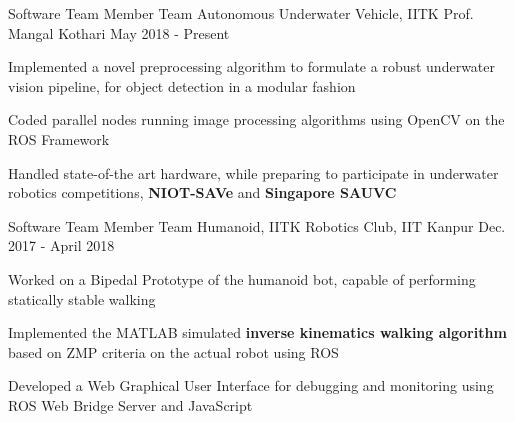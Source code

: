 
\begin{cventries}

  \cventry
    {Software Team Member}
    {Team Autonomous Underwater Vehicle, IITK}
    {Prof. Mangal Kothari}
    {May 2018 - Present}
    {
      \begin{cvitems}
        \item {Implemented a novel preprocessing algorithm to formulate a robust underwater vision pipeline, for object detection in a modular fashion}
        \item {Coded parallel nodes running image processing algorithms using OpenCV on the ROS Framework}
        \item {Handled state-of-the art hardware, while preparing to participate in underwater robotics competitions, \textbf{NIOT-SAVe} and \textbf{Singapore SAUVC} }
      \end{cvitems}
    }

    \cventry
    {Software Team Member} 
    {Team Humanoid, IITK}
    {Robotics Club, IIT Kanpur}
    {Dec. 2017 - April 2018} 
    {
      \begin{cvitems} 
        \item {Worked on a Bipedal Prototype of the humanoid bot, capable of performing statically stable walking}
        \item {Implemented the MATLAB simulated \textbf{inverse kinematics walking algorithm} based on ZMP criteria on the actual robot using ROS}
        \item {Developed a Web Graphical User Interface for debugging and monitoring using ROS Web Bridge Server and JavaScript}
      \end{cvitems}
    }

\end{cventries}
